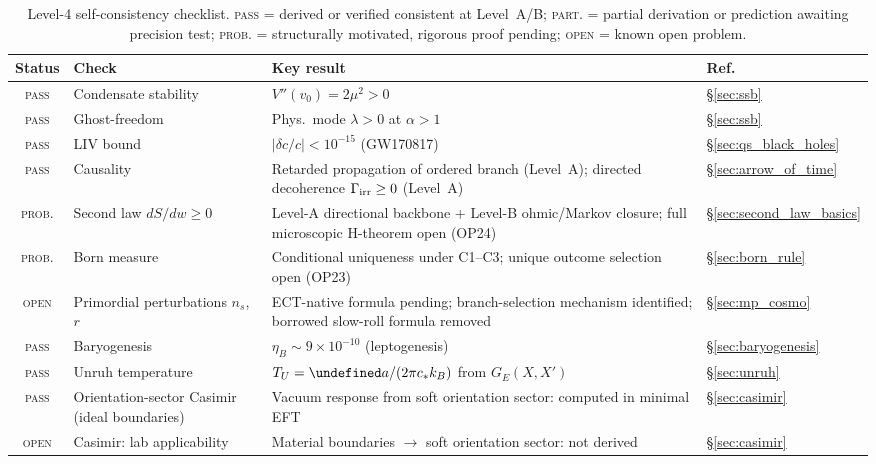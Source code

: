 \documentclass[11pt,a4paper]{article}
\let\hbar\undefined
\numberwithin{equation}{section}
\begin{document}
\begin{table}[H]
\centering
\caption{Level-4 self-consistency checklist.
\textsc{pass} = derived or verified consistent at Level~A/B;
\textsc{part.} = partial derivation or prediction awaiting precision test;
\textsc{prob.} = structurally motivated, rigorous proof pending;
\textsc{open} = known open problem.}
\label{tab:level4_checklist}
\setlength{\tabcolsep}{6pt}
\renewcommand{\arraystretch}{1.25}
\small\begin{tabular}{cp{3.8cm}p{7.2cm}l}
\toprule
\textbf{Status} & \textbf{Check} & \textbf{Key result} & \textbf{Ref.} \\
\midrule
\textsc{pass} & Condensate stability      & $V''(v_0)=2\mu^2>0$                                   & \S\ref{sec:ssb} \\
\textsc{pass} & Ghost-freedom             & Phys.\ mode $\lambda>0$ at $\alpha>1$                 & \S\ref{sec:ssb} \\
\textsc{pass} & LIV bound                 & $|\delta c/c|<10^{-15}$ (GW170817)                    & \S\ref{sec:qs_black_holes} \\
\textsc{pass} & Causality                 & Retarded propagation of ordered branch (Level~A); directed decoherence $\Gamma_{\rm irr}\geq 0$ (Level~A)                & \S\ref{sec:arrow_of_time} \\
\textsc{prob.}& Second law $dS/dw\geq0$  & Level-A directional backbone + Level-B ohmic/Markov closure; full microscopic H-theorem open (OP24) & \S\ref{sec:second_law_basics} \\
\textsc{prob.}& Born measure              & Conditional uniqueness under C1--C3; unique outcome selection open (OP23) & \S\ref{sec:born_rule} \\
\textsc{open} & Primordial perturbations $n_s$, $r$ & ECT-native formula pending; branch-selection mechanism identified; borrowed slow-roll formula removed & \S\ref{sec:mp_cosmo} \\
\textsc{pass} & Baryogenesis              & $\eta_B\sim9\times10^{-10}$ (leptogenesis)            & \S\ref{sec:baryogenesis} \\
\textsc{pass} & Unruh temperature         & $T_U=\hbar a/(2\pi c_*k_B)$ from $G_E(X,X')$         & \S\ref{sec:unruh} \\
\textsc{pass} & Orientation-sector Casimir (ideal boundaries) & Vacuum response from soft orientation sector: computed in minimal EFT & \S\ref{sec:casimir} \\
\textsc{open} & Casimir: lab applicability & Material boundaries $\to$ soft orientation sector: not derived & \S\ref{sec:casimir} \\

\end{tabular}
\end{table}
\end{document}
